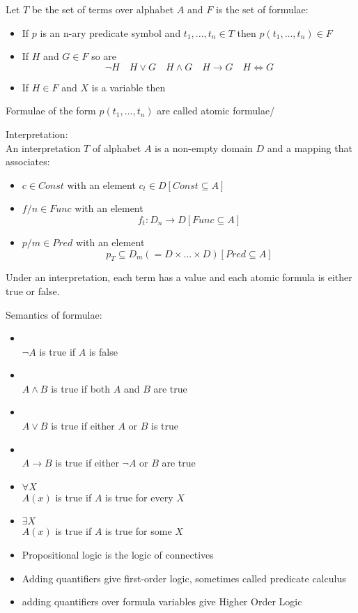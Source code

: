 Let $T$ be the set of terms over alphabet $A$ and $F$ is the set of formulae:
\begin{itemize}
\item If $p$ is an n-ary predicate symbol and $t_1,...,t_n \in T$ then $p(t_1,...,t_n) \in F$
\item If $H$ and $G \in F$ so are 
\[\neg{H} \quad H\lor G \quad H\land G \quad H \rightarrow G \quad H\iff G\]
\item If $H\in F$ and $X$ is a variable then 
\end{itemize}
Formulae of the form $p(t_1,..., t_n)$ are called atomic formulae/

Interpretation:\\
An interpretation $T$ of alphabet $A$ is a non-empty domain $D$ and a mapping that associates:
\begin{itemize}
\item $c \in Const$ with an element $c_t \in D [Const \subseteq A]$
\item $f/n \in Func$ with an element 
\[f_t: D_n \rightarrow D [Func\subseteq A]\]
\item $p/m \in Pred$ with an element 
\[p_T \subseteq D_m (= D\times ... \times D) [Pred\subseteq A]\]
\end{itemize}
Under an interpretation, each term has a value and each atomic formula is either true or false.

Semantics of formulae:
\begin{itemize}
\item {}\\
$\neg{A}$ is true if $A$ is false
\item {}\\
$A\land B$ is true if both $A$ and $B$ are true
\item {}\\
$A\lor B$ is true if either $A$ or $B$ is true
\item {}\\
$A\rightarrow B$ is true if either $\neg{A}$ or $B$ are true
\item {} $\forall X$\\
$A(x)$ is true if $A$ is true for every $X$
\item {} $\exists X$\\
$A(x)$ is true if $A$ is true for some $X$
\item Propositional logic is the logic of connectives
\item Adding quantifiers give first-order logic, sometimes called predicate calculus
\item adding quantifiers over formula variables give Higher Order Logic
\end{itemize}

